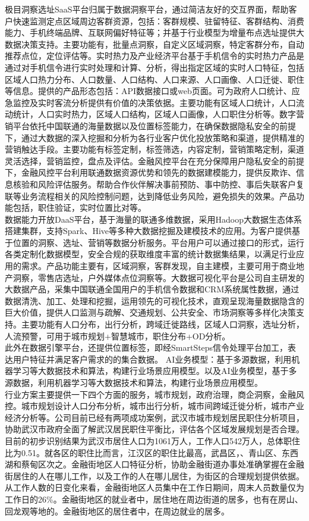 极目洞察选址SaaS平台归属于数据洞察平台，通过简洁友好的交互界面，帮助客户快速监测定点区域周边客群资源，包括：客群规模、驻留特征、客群结构、消费能力、手机终端品牌、互联网偏好特征等；并基于行业模型为增量布点选址提供大数据决策支持。主要功能有，批量点洞察，自定义区域洞察，特定客群分布，自动推荐点位，定位评估等。实时热力及产业经济平台基于手机信令的实时热力产品是通过对手机信令进行实时处理和计算、分析，得出指定区域的实时人口特征，包括区域人口热力分布、人口数量、人口结构、人口来源、人口画像、人口迁徙、职住等信息。提供的产品形态包括：API数据接口或web页面。可为政府人口统计、应急监控及实时客流分析提供有价值的决策依据。主要功能有区域人口统计，人口流动统计，人口实时热力，区域人口结构，区域人口画像，人口职住分析等。数字营销平台依托中国联通的海量数据以及位置标签能力，在确保数据隐私安全的前提下，通过大数据的深入挖掘和分析为各行业客户优化投放策略和渠道，提供精准的营销触达手段。主要功能有标签定制，标签筛选，内容定制，营销策略定制，渠道灵活选择，营销监控，盘点及评估。金融风控平台在充分保障用户隐私安全的前提下，金融风控平台利用联通数据资源优势和领先的数据建模能力，提供反欺诈、信息核验和风险评估服务。帮助合作伙伴解决事前预防、事中防控、事后失联客户复联等业务流程相关的风险控制问题，达到降低业务风险，避免损失的效果。产品功能包括，职住验证，实时位置比对等。\\
数据能力开放DaaS平台，基于海量的联通多维数据，采用Hadoop大数据生态体系搭建集群，支持Spark、Hive等多种大数据挖掘及建模技术的应用。为客户提供基于位置的洞察、选址、营销等数据分析服务。平台用户可以通过接口的形式，运行各类定制化数据模型，安全合规的获取维度丰富的统计数据集结果，以满足行业应用的需求。产品功能主要有，区域洞察，客群发现，自主建模，主要可用于商业地产洞察，零售店选址，户外媒体点位洞察等。大数据可视化平台是公司自主研发的大数据产品，采集中国联通全国用户的手机信令数据和CRM系统属性数据，通过数据清洗、加工、处理和挖掘，运用领先的可视化技术，直观呈现海量数据隐含的巨大价值，提供人口监测与疏解、交通规划、公共安全、市场洞察等多样化决策支持。主要功能有人口分布，出行分析，跨域迁徙路线，区域人口洞察，选址分析，人流预警，可用于城市规划+智慧城市，职住分布+OD分析。\\
此外在数据引擎平台，还提供位置标签，即经SmartSteps信令处理平台加工，表达用户特征并满足客户需求的的集合数据。 AI业务模型：基于多源数据，利用机器学习等大数据技术和算法，构建行业场景应用模型。以及AI业务模型，基于多源数据，利用机器学习等大数据技术和算法，构建行业场景应用模型。\\
行业方案主要提供一下四个方面的服务，城市规划，政府治理，商企洞察，金融风控。城市规划设计人口分布分析，城市出行分析，城市间跨域迁徙分析，城市产业经济分析等。公司目前已经有两项成功案例，武汉市城市规划居民职住分析项目，协助武汉市政府全面了解武汉居民职住平衡比，评估各个区域发展规划是否合理。目前的初步识别结果为武汉市居住人口为1061万人，工作人口542万人，总体职住比为0.51。就各区的职住比而言，江汉区的职住比最高，武昌区，、青山区、东西湖和蔡甸区次之。金融街地区人口特征分析，协助金融街道办事处准确掌握在金融街居住的人在哪儿工作，以及工作的人在哪儿居住，为街区的合理规划提供依据。从工作人数的日变化来看，金融街地区人员集中在工作日期间，周末人员数量仅为工作日的26\%。金融街地区的就业者中，居住地在周边街道的居多，也有在房山、回龙观等地的。金融街地区的居住者中，在周边就业的居多。\\
